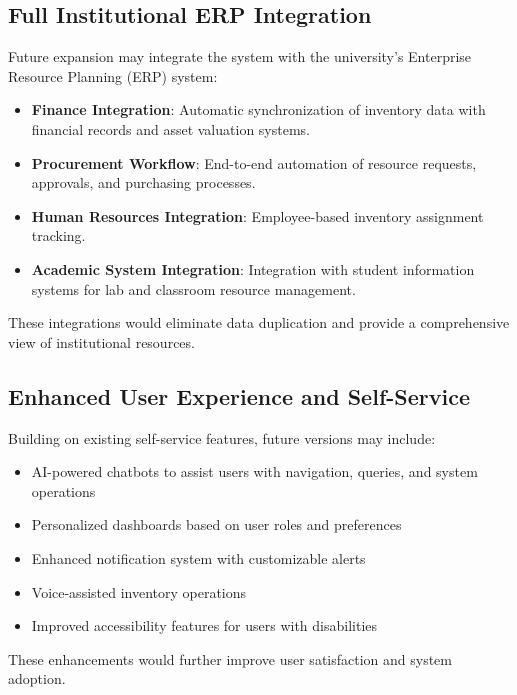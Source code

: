 \subsection{Full Institutional ERP Integration}

Future expansion may integrate the system with the university's Enterprise Resource Planning (ERP) system:

\begin{itemize}
    \item \textbf{Finance Integration}: Automatic synchronization of inventory data with financial records and asset valuation systems.

    \item \textbf{Procurement Workflow}: End-to-end automation of resource requests, approvals, and purchasing processes.

    \item \textbf{Human Resources Integration}: Employee-based inventory assignment tracking.

    \item \textbf{Academic System Integration}: Integration with student information systems for lab and classroom resource management.
\end{itemize}

These integrations would eliminate data duplication and provide a comprehensive view of institutional resources.

\subsection{Enhanced User Experience and Self-Service}

Building on existing self-service features, future versions may include:

\begin{itemize}
    \item AI-powered chatbots to assist users with navigation, queries, and system operations
    \item Personalized dashboards based on user roles and preferences
    \item Enhanced notification system with customizable alerts
    \item Voice-assisted inventory operations
    \item Improved accessibility features for users with disabilities
\end{itemize}

These enhancements would further improve user satisfaction and system adoption.

